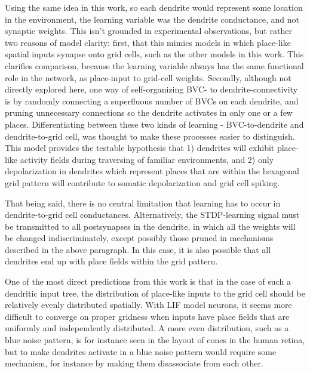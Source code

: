 \documentclass{article}
\begin{document}
    Using the same idea in this work, so each dendrite would represent some location in the environment, the learning variable was the dendrite conductance, and not synaptic weights. This isn't grounded in experimental observations, but rather two reasons of model clarity: first, that this mimics models in which place-like spatial inputs synapse onto grid cells, such as the other models in this work. This clarifies comparison, because the learning variable always has the same functional role in the network, as place-input to grid-cell weights. Secondly, although not directly explored here, one way of self-organizing BVC- to dendrite-connectivity is by randomly connecting a superfluous number of BVCs on each dendrite, and pruning unnecessary connections so the dendrite activates in only one or a few places. Differentiating between these two kinds of learning - BVC-to-dendrite and dendrite-to-grid cell, was thought to make these processes easier to distinguish. 
    This model provides the testable hypothesis that 1) dendrites will exhibit place-like activity fields during traversing of familiar environments, and 2) only depolarization in dendrites which represent places that are within the hexagonal grid pattern will contribute to somatic depolarization and grid cell spiking. 

    That being said, there is no central limitation that learning has to occur in dendrite-to-grid cell conductances. Alternatively, the STDP-learning signal must be transmitted to all postsynapses in the dendrite, in which all the weights will be changed indiscriminately, except possibly those pruned in mechanisms described in the above paragraph. In this case, it is also possible that all dendrites end up with place fields within the grid pattern.

    One of the most direct predictions from this work is that in the case of such a dendritic input tree, the distribution of place-like inputs to the grid cell should be relatively evenly distributed spatially. With LIF model neurons, it seems more difficult to converge on proper gridness when inputs have place fields that are uniformly and independently distributed. A more even distribution, such as a blue noise pattern, is for instance seen in the layout of cones in the human retina, but to make dendrites activate in a blue noise pattern would require some mechanism, for instance by making them disassociate from each other.
\end{document}
